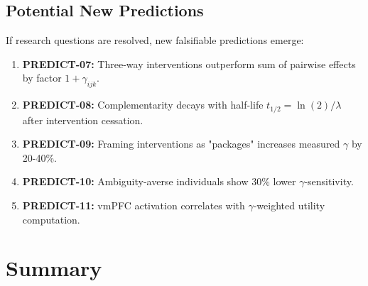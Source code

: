 \subsection{Potential New Predictions}

If research questions are resolved, new falsifiable predictions emerge:

\begin{enumerate}
    \item \textbf{PREDICT-07:} Three-way interventions outperform sum of pairwise effects by factor $1 + \gamma_{ijk}$.

    \item \textbf{PREDICT-08:} Complementarity decays with half-life $t_{1/2} = \ln(2)/\lambda$ after intervention cessation.

    \item \textbf{PREDICT-09:} Framing interventions as "packages" increases measured $\gamma$ by 20-40\%.

    \item \textbf{PREDICT-10:} Ambiguity-averse individuals show 30\% lower $\gamma$-sensitivity.

    \item \textbf{PREDICT-11:} vmPFC activation correlates with $\gamma$-weighted utility computation.
\end{enumerate}

\section{Summary}
\label{sec:summary}

